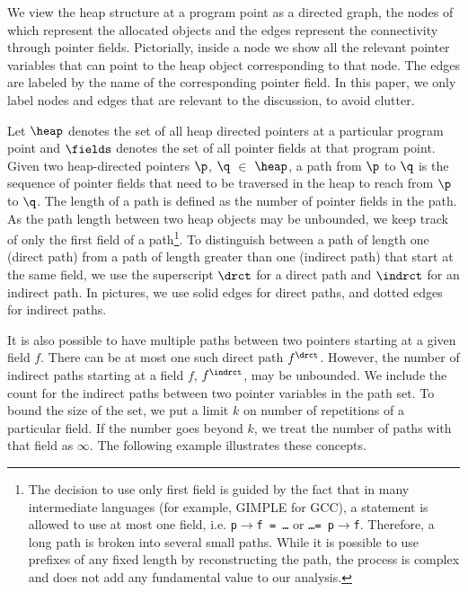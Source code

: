 We view the heap structure at a program point as a directed
graph, the nodes of which represent the allocated objects and
the edges represent the connectivity through pointer fields.
Pictorially, inside a node we show all the relevant pointer
variables that can point to the heap object corresponding to
that node. The edges are labeled by the name of the
corresponding pointer field. In this paper, we only label
nodes and edges that are relevant to the discussion, to avoid
clutter.

Let $\heap$ denotes the set  of all heap directed pointers at
a particular  program point and $\fields$ denotes  the set of
all  pointer  fields  at   that  program  point.   Given  two
heap-directed pointers $\p$, $\q$  $\in$ $\heap$, a path from
$\p$ to $\q$  is the sequence of pointer  fields that need to
be traversed  in the  heap to reach  from $\p$ to  $\q$.  The
length of a  path is defined as the  number of pointer fields
in the path.  As the path length between two heap objects may
be  unbounded, we keep  track of  only the  first field  of a
path\footnote{The decision to use  only first field is guided
  by  the  fact  that  in many  intermediate  languages  (for
  example, GIMPLE for GCC), a  statement is allowed to use at
  most  one field,  i.e.  {\tt  p$\rightarrow$f =  \ldots} or
  {\tt \ldots = p$\rightarrow$f}.   Therefore, a long path is
  broken into  several small paths.  While it  is possible to
  use  prefixes of  any  fixed length  by reconstructing  the
  path,  the  process  is   complex  and  does  not  add  any
  fundamental  value  to   our  analysis.}.   To  distinguish
between a  path of  length one (direct  path) from a  path of
length  greater than one  (indirect path)  that start  at the
same field, we use the  superscript $\drct$ for a direct path
and $\indrct$ for an indirect path. In pictures, we use solid
edges for direct paths, and dotted edges for indirect paths.

It  is  also possible  to  have  multiple  paths between  two
pointers starting at a given  field $f$. There can be at most
one  such  direct  path  $f^\drct$. However,  the  number  of
indirect paths  starting at a field $f$,  $f^\indrct$, may be
unbounded.  We  include  the  count for  the  indirect  paths
between two pointer  variables in the path set.  To bound the
size of the set, we put  a limit $k$ on number of repetitions
of  a particular  field. If  the number  goes beyond  $k$, we
treat the number of paths with that field as $\infty$. The
following example illustrates these concepts.

